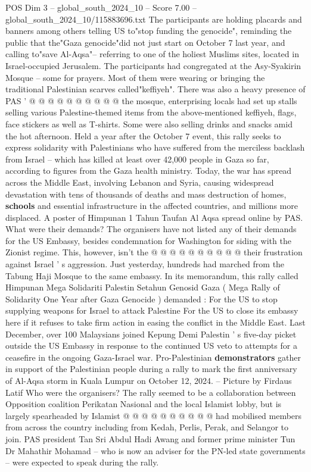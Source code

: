 \begin{textsample}{POS Dim 3 – global\_south\_2024\_10 – Score 7.00 – global\_south\_2024\_10/115883696.txt}
The participants are holding placards and banners among others telling US to"stop funding the genocide", reminding the public that the"Gaza genocide"did not just start on October 7 last year, and calling to"save Al-Aqsa"-- referring to one of the holiest Muslims sites, located in Israel-occupied Jerusalem.
The participants had congregated at the Asy-Syakirin Mosque -- some for prayers.
Most of them were wearing or bringing the traditional Palestinian scarves called"keffiyeh".
There was also a heavy presence of PAS ' @ @ @ @ @ @ @ @ @ @ the mosque, enterprising locals had set up stalls selling various Palestine-themed items from the above-mentioned keffiyeh, flags, face stickers as well as T-shirts.
Some were also selling drinks and snacks amid the hot afternoon.
Held a year after the October 7 event, this rally seeks to express solidarity with Palestinians who have suffered from the merciless backlash from Israel -- which has killed at least over 42,000 people in Gaza so far, according to figures from the Gaza health ministry.
Today, the war has spread across the Middle East, involving Lebanon and Syria, causing widespread devastation with tens of thousands of deaths and mass destruction of homes, \textbf{schools} and essential infrastructure in the affected countries, and millions more displaced.
A poster of Himpunan 1 Tahun Taufan Al Aqsa spread online by PAS.
What were their demands?
The organisers have not listed any of their demands for the US Embassy, besides condemnation for Washington for siding with the Zionist regime.
This, however, isn't the @ @ @ @ @ @ @ @ @ @ their frustration against Israel ' s aggression.
Just yesterday, hundreds had marched from the Tabung Haji Mosque to the same embassy.
In its memorandum, this rally called Himpunan Mega Solidariti Palestin Setahun Genosid Gaza ( Mega Rally of Solidarity One Year after Gaza Genocide ) demanded : For the US to stop supplying weapons for Israel to attack Palestine For the US to close its embassy here if it refuses to take firm action in easing the conflict in the Middle East.
Last December, over 100 Malaysians joined Kepung Demi Palestin ' s five-day picket outside the US Embassy in response to the continued US veto to attempts for a ceasefire in the ongoing Gaza-Israel war.
Pro-Palestinian \textbf{demonstrators} gather in support of the Palestinian people during a rally to mark the first anniversary of Al-Aqsa storm in Kuala Lumpur on October 12, 2024. -- Picture by Firdaus Latif Who were the organisers?
The rally seemed to be a collaboration between Opposition coalition Perikatan Nasional and the local Islamist lobby, but is largely spearheaded by Islamist @ @ @ @ @ @ @ @ @ @ had mobilised members from across the country including from Kedah, Perlis, Perak, and Selangor to join.
PAS president Tan Sri Abdul Hadi Awang and former prime minister Tun Dr Mahathir Mohamad -- who is now an adviser for the PN-led state governments -- were expected to speak during the rally.

\end{textsample}
